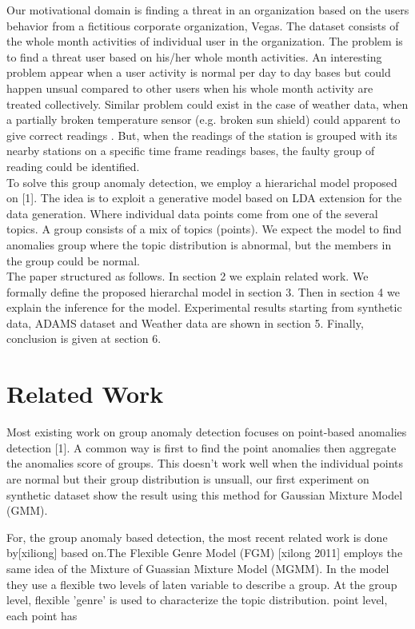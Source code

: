 \documentclass[letterpaper]{article}
\begin{document}
Our motivational domain is finding a threat in an organization based on the users behavior from a fictitious corporate organization, Vegas. The dataset consists of the whole month activities of individual user in the organization. The problem is to find a threat user based on his/her whole month activities. An interesting problem appear when a user activity is normal per day to day bases but could happen unsual compared to other users when his whole month activity are treated collectively. Similar problem could exist in the case of weather data, when a partially broken temperature sensor (e.g. broken sun shield) could apparent to give correct readings . But, when the readings of the station is grouped with its nearby stations on a specific time frame readings bases, the faulty group of reading could be identified.\\

To solve this group anomaly detection, we employ a hierarichal model proposed on [1]. The idea is to exploit a generative model based on LDA extension for the data generation. Where individual data points come from one of the several topics. A group consists of a mix of topics (points). We expect the model to find anomalies group where the topic distribution is abnormal, but the members in the group could be normal.  \\

The paper structured as follows. In section 2 we explain related work. We formally define the proposed hierarchal model in section 3. Then in section 4 we explain the inference for the model. Experimental results starting from synthetic data, ADAMS dataset and Weather data are shown in section 5. Finally, conclusion is given at section 6. \\
\section{Related Work}
Most existing work on group anomaly detection focuses on point-based anomalies detection [1]. A common way is first to find the point anomalies then aggregate the anomalies score of groups. This doesn't work well when the individual points are normal but their group distribution is unsuall, our first experiment on synthetic dataset show the result using this method for Gaussian Mixture Model (GMM). 

For, the group anomaly based detection, the most recent related work is done by[xiliong] based on.The Flexible Genre Model (FGM) [xilong 2011] employs the same idea of the Mixture of Guassian Mixture Model (MGMM). In the model they use a flexible two levels of laten variable to describe a group. At the group level, flexible 'genre' is used to characterize the topic distribution. point level, each point has  
\end{document}
